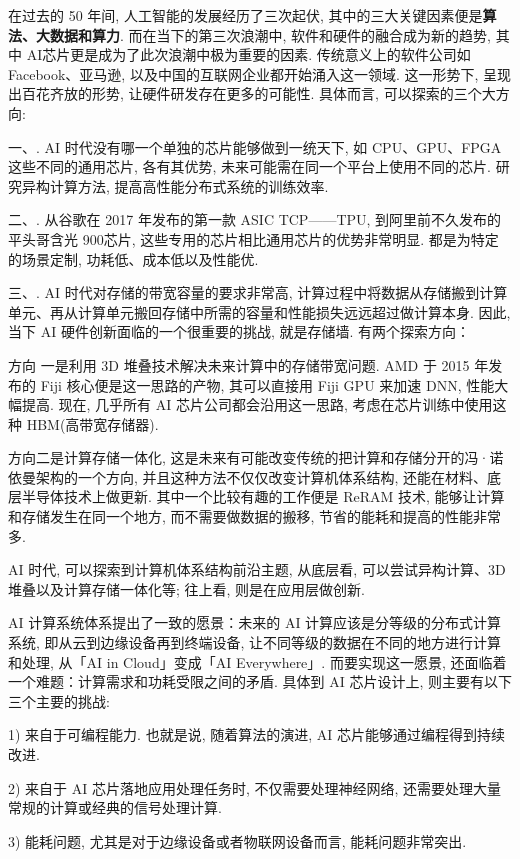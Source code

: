 在过去的 50 年间, 人工智能的发展经历了三次起伏, 其中的三大关键因素便是\textbf{算法、大数据和算力}.
而在当下的第三次浪潮中, 软件和硬件的融合成为新的趋势, 其中 AI芯片更是成为了此次浪潮中极为重要的因素. 传统意义上的软件公司如 Facebook、亚马逊, 以及中国的互联网企业都开始涌入这一领域.
这一形势下, 呈现出百花齐放的形势, 让硬件研发存在更多的可能性.
具体而言, 可以探索的三个大方向:

一、. AI 时代没有哪一个单独的芯片能够做到一统天下, 如 CPU、GPU、FPGA 这些不同的通用芯片, 各有其优势, 未来可能需在同一个平台上使用不同的芯片. 研究异构计算方法, 提高高性能分布式系统的训练效率.

二、. 从谷歌在 2017 年发布的第一款 ASIC TCP——TPU, 到阿里前不久发布的平头哥含光 900芯片, 这些专用的芯片相比通用芯片的优势非常明显. 都是为特定的场景定制, 功耗低、成本低以及性能优.

三、. AI 时代对存储的带宽容量的要求非常高, 计算过程中将数据从存储搬到计算单元、再从计算单元搬回存储中所需的容量和性能损失远远超过做计算本身. 因此, 当下 AI 硬件创新面临的一个很重要的挑战, 就是存储墙. 有两个探索方向：

方向 一是利用 3D 堆叠技术解决未来计算中的存储带宽问题. AMD 于 2015 年发布的 Fiji 核心便是这一思路的产物, 其可以直接用 Fiji GPU 来加速 DNN, 性能大幅提高. 现在, 几乎所有 AI 芯片公司都会沿用这一思路, 考虑在芯片训练中使用这种 HBM(高带宽存储器).

方向二是计算存储一体化, 这是未来有可能改变传统的把计算和存储分开的冯·诺依曼架构的一个方向, 并且这种方法不仅仅改变计算机体系结构, 还能在材料、底层半导体技术上做更新. 其中一个比较有趣的工作便是 ReRAM 技术, 能够让计算和存储发生在同一个地方, 而不需要做数据的搬移, 节省的能耗和提高的性能非常多.

AI 时代, 可以探索到计算机体系结构前沿主题, 从底层看, 可以尝试异构计算、3D 堆叠以及计算存储一体化等; 往上看, 则是在应用层做创新.

AI 计算系统体系提出了一致的愿景：未来的 AI 计算应该是分等级的分布式计算系统, 即从云到边缘设备再到终端设备, 让不同等级的数据在不同的地方进行计算和处理, 从「AI in Cloud」变成「AI Everywhere」.
而要实现这一愿景, 还面临着一个难题：计算需求和功耗受限之间的矛盾. 具体到 AI 芯片设计上, 则主要有以下三个主要的挑战:

1) 来自于可编程能力. 也就是说, 随着算法的演进, AI 芯片能够通过编程得到持续改进.

2) 来自于 AI 芯片落地应用处理任务时, 不仅需要处理神经网络, 还需要处理大量常规的计算或经典的信号处理计算.

3) 能耗问题, 尤其是对于边缘设备或者物联网设备而言, 能耗问题非常突出.

